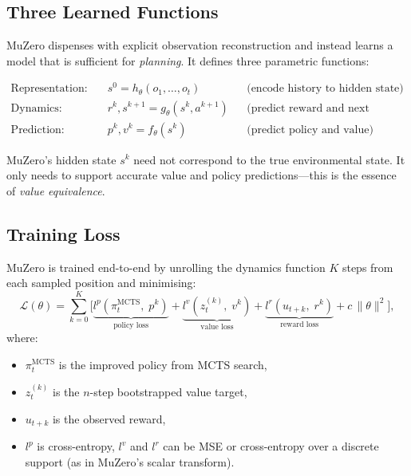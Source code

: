 \documentclass[11pt,a4paper]{article}
\theoremstyle{definition}
\begin{document}
\subsection{Three Learned Functions}

MuZero \cite{schrittwieser2020mastering} dispenses with explicit
observation reconstruction and instead learns a model that is sufficient
for \emph{planning}. It defines three parametric functions:

\begin{align}
  \text{Representation:} &\quad s^0 = h_\theta(o_1, \ldots, o_t)
    & &\text{(encode history to hidden state)} \label{eq:mu_repr}\\
  \text{Dynamics:} &\quad r^k, s^{k+1} = g_\theta(s^k, a^{k+1})
    & &\text{(predict reward and next hidden state)} \label{eq:mu_dyn}\\
  \text{Prediction:} &\quad p^k, v^k = f_\theta(s^k)
    & &\text{(predict policy and value)} \label{eq:mu_pred}
\end{align}

\begin{keyinsight}
MuZero's hidden state $s^k$ need not correspond to the true
environmental state. It only needs to support accurate value and policy
predictions---this is the essence of \emph{value equivalence}.
\end{keyinsight}

\subsection{Training Loss}

MuZero is trained end-to-end by unrolling the dynamics function $K$
steps from each sampled position and minimising:
\begin{equation}\label{eq:muzero_loss}
  \mathcal{L}(\theta) = \sum_{k=0}^{K}\Big[
    \underbrace{l^p(\pi_t^{\mathrm{MCTS}},\; p^k)}_{\text{policy loss}}
    + \underbrace{l^v(z_t^{(k)},\; v^k)}_{\text{value loss}}
    + \underbrace{l^r(u_{t+k},\; r^k)}_{\text{reward loss}}
    + c\,\|\theta\|^2
  \Big],
\end{equation}
where:
\begin{itemize}
  \item $\pi_t^{\mathrm{MCTS}}$ is the improved policy from MCTS search,
  \item $z_t^{(k)}$ is the $n$-step bootstrapped value target,
  \item $u_{t+k}$ is the observed reward,
  \item $l^p$ is cross-entropy, $l^v$ and $l^r$ can be MSE or
    cross-entropy over a discrete support (as in MuZero's scalar
    transform).
\end{itemize}
\end{document}
